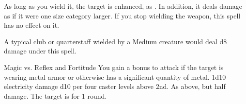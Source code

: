 \begin{spellheader}
    \begin{spelltargetinginfo}
    \end{spelltargetinginfo}
\end{spellheader}
\begin{spellcontent}
    \begin{spelleffects}
        \spelleffect As long as you wield it, the target is enhanced, as . In addition, it deals damage as if it were one size category larger. If you stop wielding the weapon, this spell has no effect on it.
        \spelldur{\durshort}
    \end{spelleffects}
\end{spellcontent}
\begin{spellfooter}
    \spellnotes A typical club or quarterstaff wielded by a Medium creature would deal d8 damage under this spell.
\end{spellfooter}

\begin{spellheader}
    \begin{spelltargetinginfo}
    \end{spelltargetinginfo}
\end{spellheader}
\begin{spellcontent}
    \begin{spelleffects}
        \begin{spellattack}{Magic vs. Reflex and Fortitude}
            \spellspecial You gain a  bonus to attack if the target is wearing metal armor or otherwise has a significant quantity of metal.
            \spellsuccess[Reflex] 1d10 electricity damage \add d10 per four caster levels above 2nd.
            \spellfailure[Reflex] As above, but half damage.
             The target is \staggered for 1 round.
        \end{spellattack}
    \end{spelleffects}
\end{spellcontent}
\begin{spellfooter}

\end{spellfooter}


